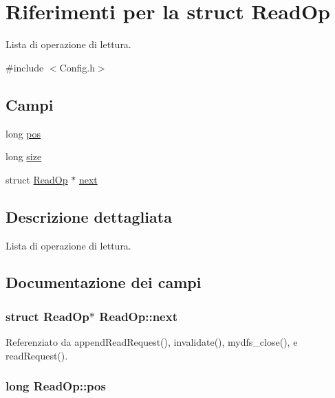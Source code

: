 \hypertarget{structReadOp}{\section{Riferimenti per la struct Read\+Op}
\label{structReadOp}
}


Lista di operazione di lettura.  




{\ttfamily \#include $<$Config.\+h$>$}

\subsection*{Campi}
\begin{DoxyCompactItemize}
\item 
long \hyperlink{structReadOp_a5659a814b4b0696cc017d5ea088eb2c1}{pos}
\item 
long \hyperlink{structReadOp_a2562187098302a2641f29f89e77748b0}{size}
\item 
struct \hyperlink{structReadOp}{Read\+Op} $\ast$ \hyperlink{structReadOp_ac84186a2d784cb2fbd0c71dd7d5df78d}{next}
\end{DoxyCompactItemize}


\subsection{Descrizione dettagliata}
Lista di operazione di lettura. 

\subsection{Documentazione dei campi}
\hypertarget{structReadOp_ac84186a2d784cb2fbd0c71dd7d5df78d}{
\subsubsection[{next}]{\setlength{\rightskip}{0pt plus 5cm}struct {\bf Read\+Op}$\ast$ Read\+Op\+::next}}\label{structReadOp_ac84186a2d784cb2fbd0c71dd7d5df78d}


Referenziato da append\+Read\+Request(), invalidate(), mydfs\+\_\+close(), e read\+Request().

\hypertarget{structReadOp_a5659a814b4b0696cc017d5ea088eb2c1}{
\subsubsection[{pos}]{\setlength{\rightskip}{0pt plus 5cm}long Read\+Op\+::pos}}\label{structReadOp_a5659a814b4b0696cc017d5ea088eb2c1}


